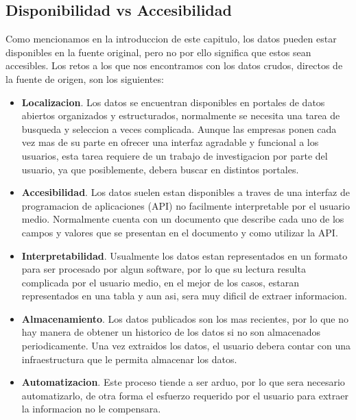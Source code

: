\subsection{Disponibilidad vs Accesibilidad}
    
Como mencionamos en la introduccion de este capitulo, los datos pueden estar disponibles en la fuente original, pero no por
ello significa que estos sean accesibles.
Los retos a los que nos encontramos con los datos crudos, directos de la fuente de origen, son los siguientes:
    
    \begin{itemize}
        \item \textbf{Localizacion}. Los datos se encuentran disponibles en portales de datos abiertos organizados 
        y estructurados, normalmente se necesita una tarea de busqueda y seleccion
        a veces complicada. Aunque las empresas ponen cada vez mas de su parte en ofrecer una interfaz 
        agradable y funcional a los usuarios, esta tarea requiere de un trabajo de investigacion por parte del usuario,
        ya que posiblemente, debera buscar en distintos portales.
        \item \textbf{Accesibilidad}. Los datos suelen estan disponibles a traves de una interfaz de programacion 
        de aplicaciones (API) no facilmente interpretable por el usuario medio. Normalmente cuenta con 
        un documento que describe cada uno de los campos y valores que se presentan en el documento y como utilizar la API.
        \item \textbf{Interpretabilidad}. Usualmente los datos estan representados en un formato para ser procesado por 
        algun software, por lo que su lectura resulta complicada por el usuario medio, en el mejor de los casos, 
        estaran representados en una tabla y aun asi, sera muy dificil de extraer informacion.
        \item \textbf{Almacenamiento}. Los datos publicados son los mas recientes, por lo que no hay manera de obtener 
        un historico de los datos si no son almacenados periodicamente. Una vez extraidos los datos, el usuario debera 
        contar con una infraestructura que le permita almacenar los datos.
        \item \textbf{Automatizacion}. Este proceso tiende a ser arduo, por lo que sera necesario automatizarlo, de otra 
        forma el esfuerzo requerido por el usuario para extraer la informacion no le compensara.
         
    \end{itemize}
    
